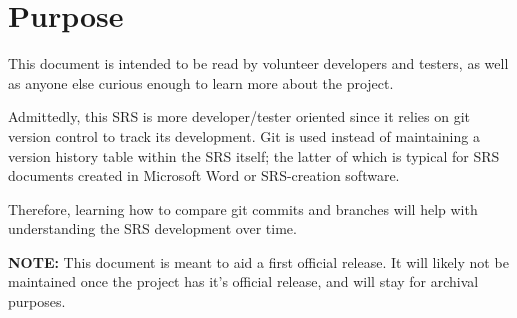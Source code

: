 \section{Purpose}

This document is intended to be read by volunteer developers and testers, as well as anyone else curious enough to learn more about the project.

Admittedly, this SRS is more developer/tester oriented since it relies on git version control to track its development. Git is  used instead of maintaining a version history table within the SRS itself; the latter of which is typical for SRS documents created in Microsoft Word or SRS-creation software.

Therefore, learning how to compare git commits and branches will help with understanding the SRS development over time. 


\textbf{NOTE:} This document is meant to aid a first official release. It will likely not be maintained once the project has it's official release, and will stay for archival purposes.

